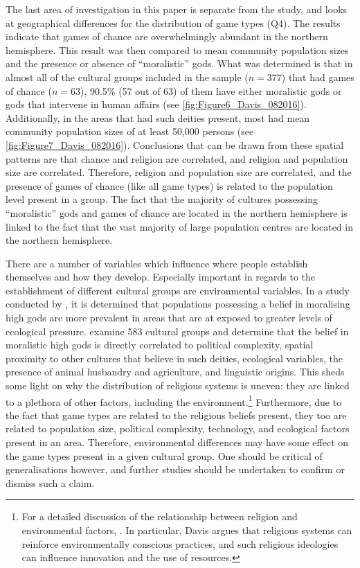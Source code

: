 \documentclass[%
	]{ijsra}
\begin{document}
The last area of investigation in this paper is separate from the \textcite{roberts1959} study, and looks at geographical differences for the distribution of game types (Q4). The results indicate that games of chance are overwhelmingly abundant in the northern hemisphere. This result was then compared to mean community population sizes and the presence or absence of ``moralistic” gods. What was determined is that in almost all of the cultural groups included in the sample ($n = 377$) that had games of chance ($n = 63$), 90.5\% (57 out of 63) of them have either moralistic gods or gods that intervene in human affairs (see \cref{fig:Figure6_Davis_082016}). Additionally, in the areas that had such deities present, most had mean community population sizes of at least 50,000 persons (see \cref{fig:Figure7_Davis_082016}). Conclusions that can be drawn from these spatial patterns are that chance and religion are correlated, and religion and population size are correlated. Therefore, religion and population size are correlated, and the presence of games of chance (like all game types) is related to the population level present in a group. The fact that the majority of cultures possessing ``moralistic” gods and games of chance are located in the northern hemisphere is linked to the fact that the vast majority of large population centres are located in the northern hemisphere.

There are a number of variables which influence where people establish themselves and how they develop. Especially important in regards to the establishment of different cultural groups are environmental variables. In a study conducted by \textcite{botero2014}, it is determined that populations possessing a belief in moralising high gods are more prevalent in areas that are at exposed to greater levels of ecological pressure. \textcite[16786]{botero2014} examine 583 cultural groups and determine that the belief in moralistic high gods is directly correlated to political complexity, spatial proximity to other cultures that believe in such deities, ecological variables, the presence of animal husbandry and agriculture, and linguistic origins. This sheds some light on why the distribution of religious systems is uneven: they are linked to a plethora of other factors, including the environment.\footnote{For a detailed discussion of the relationship between religion and environmental factors, \textcite{davis}. In particular, Davis argues that religious systems can reinforce environmentally conscious practices, and such religious ideologies can influence innovation and the use of resources.} Furthermore, due to the fact that game types are related to the religious beliefs present, they too are related to population size, political complexity, technology, and ecological factors present in an area. Therefore, environmental differences may have some effect on the game types present in a given cultural group. One should be critical of generalisations however, and further studies should be undertaken to confirm or dismiss such a claim.
\end{document}

